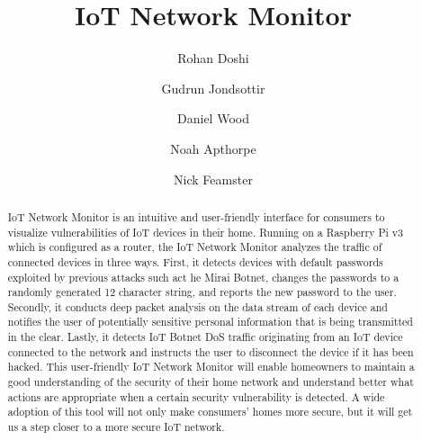 \documentclass[sigconf]{acmart}
\begin{document}
\title{IoT Network Monitor} 
\author{Rohan Doshi}
\author{Gudrun Jondsottir}
\author{Daniel Wood}
\author{Noah Apthorpe}
\author{Nick Feamster}

\begin{abstract}
IoT Network Monitor is an intuitive and user-friendly interface for consumers to visualize vulnerabilities of IoT devices in their home. Running on a Raspberry Pi v3 which is configured as a router, the IoT Network Monitor analyzes the traffic of connected devices in three ways. First, it detects devices with default passwords exploited by previous attacks such act he Mirai Botnet, changes the passwords to a randomly generated 12 character string, and reports the new password to the user. Secondly, it conducts deep packet analysis on the data stream of each device and notifies the user of potentially sensitive personal information that is being transmitted in the clear. Lastly, it detects IoT Botnet DoS traffic originating from an IoT device connected to the network and instructs the user to disconnect the device if it has been hacked. This user-friendly IoT Network Monitor will enable homeowners to maintain a good understanding of the security of their home network and understand better what actions are appropriate when a certain security vulnerability is detected. A wide adoption of this tool will not only make consumers' homes more secure, but it will get us a step closer to a more secure IoT network.
\end{abstract}


\maketitle




\end{document}
